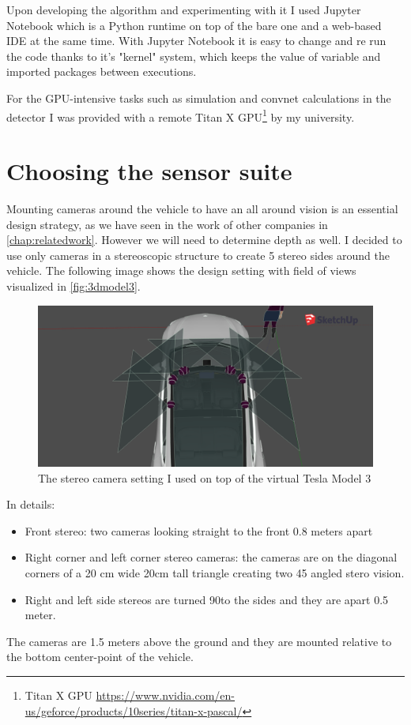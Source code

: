Upon developing the algorithm and experimenting with it I used Jupyter Notebook
which is a Python runtime on top of the bare one and a web-based IDE at the same
time. With Jupyter Notebook it is easy to change and re run the code thanks
to it's "kernel" system, which keeps the value of variable and imported packages
between executions.

For the GPU-intensive tasks such as simulation and convnet calculations in the
detector I was provided with a remote Titan X GPU\footnote{ Titan X GPU
    \url{https://www.nvidia.com/en-us/geforce/products/10series/titan-x-pascal/}} by
my university.

\section{Choosing the sensor suite}

Mounting cameras around the vehicle to have an all around vision is an essential
design strategy, as we have seen in the work of other companies in
\autoref{chap:relatedwork}. However we will need to determine depth as well. I
decided to use only cameras in a stereoscopic structure to create 5 stereo sides
around the vehicle. The following image shows the design setting with field of
views visualized in \autoref{fig:3dmodel3}.

\begin{figure}[!ht]
    \centering
    \includegraphics[width=150mm, keepaspectratio]{figures/3dmodel3.png}
    \caption{The stereo camera setting I used on top of the virtual Tesla Model 3}
    \label{fig:3dmodel3}
\end{figure}

In details: 
\begin{itemize}
    \item Front stereo: two cameras looking straight to the front 0.8 meters
          apart
    \item Right corner and left corner stereo cameras: the cameras are on the
          diagonal corners of a 20 cm wide 20cm tall triangle creating two 45\degree
          angled stero vision.
    \item Right and left side stereos are turned 90\degree to the sides and they are apart 0.5 meter.
\end{itemize}
The cameras are 1.5 meters above the ground and they are mounted relative to the
bottom center-point of the vehicle.

